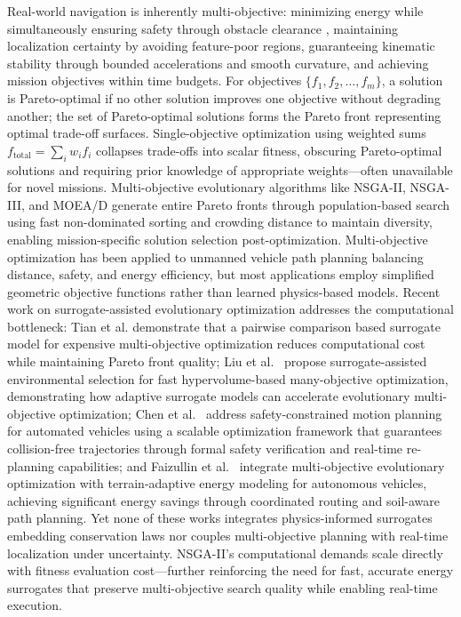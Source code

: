 \documentclass[pdflatex,sn-nature]{sn-jnl}%
\begin{document}
Real-world navigation is inherently multi-objective: minimizing energy while simultaneously ensuring safety through obstacle clearance \cite{Tian2023pairwise}, maintaining localization certainty by avoiding feature-poor regions\cite{Xu2017immukf}, guaranteeing kinematic stability through bounded accelerations and smooth curvature, and achieving mission objectives within time budgets. For objectives $\{f_1, f_2, \ldots, f_m\}$, a solution is Pareto-optimal if no other solution improves one objective without degrading another; the set of Pareto-optimal solutions forms the Pareto front representing optimal trade-off surfaces. Single-objective optimization using weighted sums $f_{\text{total}} = \sum_i w_i f_i$ collapses trade-offs into scalar fitness, obscuring Pareto-optimal solutions and requiring prior knowledge of appropriate weights—often unavailable for novel missions. Multi-objective evolutionary algorithms like NSGA-II\cite{Deb2002}, NSGA-III\cite{Deb2014}, and MOEA/D\cite{Zhang2007} generate entire Pareto fronts through population-based search using fast non-dominated sorting and crowding distance to maintain diversity, enabling mission-specific solution selection post-optimization. Multi-objective optimization has been applied to unmanned vehicle path planning balancing distance, safety, and energy efficiency\cite{Zheng2023moea,Gu2022mopp}, but most applications employ simplified geometric objective functions rather than learned physics-based models. Recent work on surrogate-assisted evolutionary optimization addresses the computational bottleneck: Tian et al. \cite{Tian2023pairwise} demonstrate that a pairwise comparison based surrogate model for expensive multi-objective optimization reduces computational cost while maintaining Pareto front quality; Liu et al.~\cite{Liu2024surrogate} propose surrogate-assisted environmental selection for fast hypervolume-based many-objective optimization, demonstrating how adaptive surrogate models can accelerate evolutionary multi-objective optimization; Chen et al.~\cite{Chen2024safety} address safety-constrained motion planning for automated vehicles using a scalable optimization framework that guarantees collision-free trajectories through formal safety verification and real-time re-planning capabilities; and Faizullin et al.~\cite{Faizullin2025mo} integrate multi-objective evolutionary optimization with terrain-adaptive energy modeling for autonomous vehicles, achieving significant energy savings through coordinated routing and soil-aware path planning. Yet none of these works integrates physics-informed surrogates embedding conservation laws nor couples multi-objective planning with real-time localization under uncertainty. NSGA-II's computational demands scale directly with fitness evaluation cost—further reinforcing the need for fast, accurate energy surrogates that preserve multi-objective search quality while enabling real-time execution.
\end{document}
